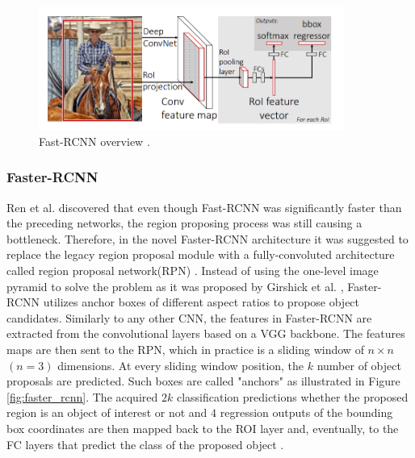 \documentclass[english, 12pt, a4paper, elec, utf8, a-1b, online]{aaltothesis}
\begin{document}
\begin{figure}[htb]
	\begin{center}
		\includegraphics[width=10cm]{./fast_rcnn.png}
	\end{center}
	\caption{Fast-RCNN overview \cite{Girshick2015}.}\label{fast_rcnn}
	\begin{center}
	\end{center}
\end{figure}
\FloatBarrier

\subsubsection{Faster-RCNN} 
Ren et al. \cite{ima} discovered that even though Fast-RCNN was significantly faster than the preceding networks, the region proposing process was still causing a bottleneck. Therefore, in the novel Faster-RCNN \cite{ima} architecture it was suggested to replace the legacy region proposal module with a fully-convoluted architecture called region proposal network(RPN) \cite{Girshick2013}. Instead of using the one-level image pyramid to solve the problem as it was proposed by Girshick et al. \cite{Girshick2015}, Faster-RCNN utilizes anchor boxes of different aspect ratios to propose object candidates. Similarly to any other CNN, the features in Faster-RCNN are extracted from the convolutional layers based on a VGG backbone. The features maps are then sent to the RPN, which in practice is a sliding window  of $n\times n$ $(n=3)$ dimensions. At every sliding window position, the $k$ number of object proposals are predicted. Such boxes are called "anchors" as illustrated in Figure \ref{fig:faster_rcnn}. The acquired $2k$ classification predictions whether the proposed region is an object of interest or not and $4$ regression outputs of the bounding box coordinates are then mapped back to the ROI layer and, eventually, to the FC layers that predict the class of the proposed object \cite{ima}. 
\end{document}
